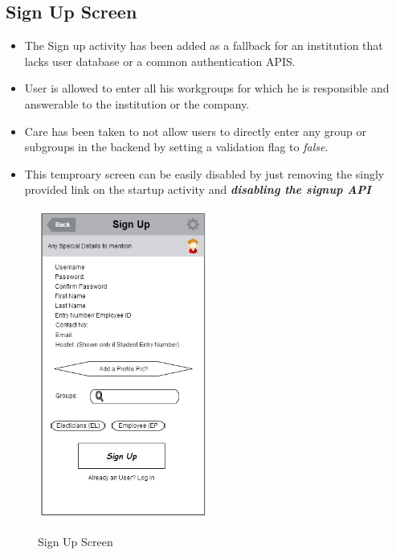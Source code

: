 \documentclass[12pt]{article}
\begin{document}


    \subsection{Sign Up Screen}
    \par 
    \begin{itemize} 
    \item The Sign up activity has been added as a fallback for an institution that lacks user database or a common authentication APIS. 
    \item User is allowed to enter all his workgroups for which he is responsible and answerable to the institution or the company.
    \item Care has been taken to not allow users to directly enter any group or subgroups in the backend by setting a validation flag to \textit{false}.
    \item This temproary screen can be easily disabled by just removing the singly provided link on the startup activity and \textbf{\textit{disabling the signup API}}
    \end{itemize}


    \begin{figure}[H]
        \centering
        \includegraphics[width=0.5\textwidth]{./appMockUp/signUpScreen}
        \label{fig:SignUpScreen}
        \caption{Sign Up Screen}

    \end{figure}
\end{document}
